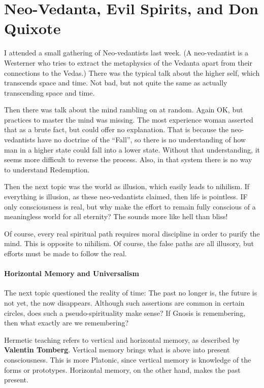 \section{Neo-Vedanta, Evil Spirits, and Don Quixote}

I attended a small gathering of Neo-vedantists last week. (A neo-vedantist is a Westerner who tries to extract the metaphysics of the Vedanta apart from their connections to the Vedas.) There was the typical talk about the higher self, which transcends space and time. Not bad, but not quite the same as actually transcending space and time.

Then there was talk about the mind rambling on at random. Again OK, but practices to master the mind was missing. The most experience woman asserted that as a brute fact, but could offer no explanation. That is because the neo-vedantists have no doctrine of the ``Fall'', so there is no understanding of how man in a higher state could fall into a lower state. Without that understanding, it seems more difficult to reverse the process. Also, in that system there is no way to understand Redemption.

Then the next topic was the world as illusion, which easily leads to nihilism. If everything is illusion, as these neo-vedantists claimed, then life is pointless. IF only consciousness is real, but why make the effort to remain fully conscious of a meaningless world for all eternity? The sounds more like hell than bliss!

Of course, every real spiritual path requires moral discipline in order to purify the mind. This is opposite to nihilism. Of course, the false paths are all illusory, but efforts must be made to follow the real.

\paragraph{Horizontal Memory and Universalism}


The next topic questioned the reality of time: The past no longer is, the future is not yet, the now disappears. Although such assertions are common in certain circles, does such a pseudo-spirituality make sense? If Gnosis is remembering, then what exactly are we remembering?

Hermetic teaching refers to vertical and horizontal memory, as described by \textbf{Valentin Tomberg}. Vertical memory brings what is above into present consciousness. This is more Platonic, since vertical memory is knowledge of the forms or prototypes. Horizontal memory, on the other hand, makes the past present.

